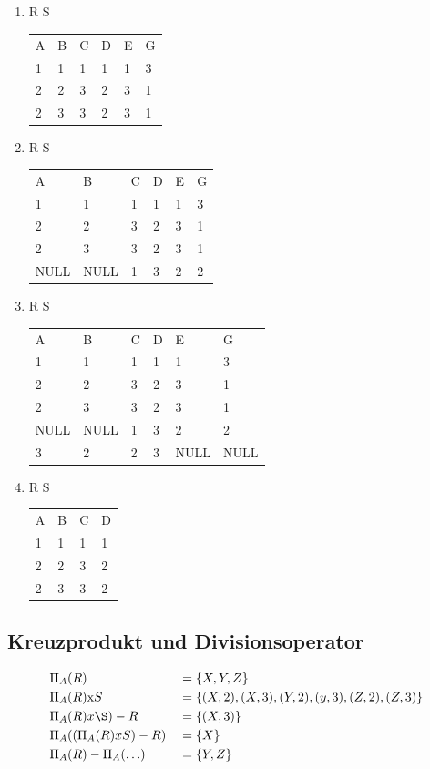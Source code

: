 \subsection{}
\begin{enumerate}
	\item R {\tiny  \textifsym{|><|}} S
	\begin{tabularx}{\textwidth}{XXXXXX}	
	A	&B	&C	&D	&E	&G \\
	1	&1	&1	&1	&1	&3 \\
	2	&2	&3	&2	&3	&1 \\
	2	&3	&3	&2	&3	&1 \\
	\end{tabularx}
	\item R {\tiny  {}} S
	\begin{tabularx}{\textwidth}{XXXXXX}	
	A	&B	&C	&D	&E	&G \\
	1	&1	&1	&1	&1	&3 \\
	2	&2	&3	&2	&3	&1 \\
	2	&3	&3	&2	&3	&1 \\
	NULL &NULL &1 &3 &2 &2 \\
	\end{tabularx}
	\item R {\tiny  {}} S
	\begin{tabularx}{\textwidth}{XXXXXX}	
	A	&B	&C	&D	&E	&G \\
	1	&1	&1	&1	&1	&3 \\
	2	&2	&3	&2	&3	&1 \\
	2	&3	&3	&2	&3	&1 \\
	NULL &NULL &1 &3 &2 &2 \\
	3	&2	&2	&3	&NULL &NULL \\
	\end{tabularx}
	\item R {\tiny  \textifsym{|><}} S
	\begin{tabularx}{\textwidth}{XXXX}	
	A	&B	&C	&D \\
	1	&1	&1	&1 \\
	2	&2	&3	&2 \\
	2	&3	&3	&2 \\
	\end{tabularx}
\end{enumerate}

\subsection{Kreuzprodukt und Divisionsoperator}
\begin{align*}
	&\Pi_A(R) &&= \{X,Y,Z\} \\
	&\Pi_A(R) \text{x} S &&= \{(X,2),(X,3),(Y,2),(y,3),(Z,2),(Z,3)\} \\
	&\Pi_A(R) x \S) - R &&= \{(X,3)\} \\
	&\Pi_A((\Pi_A (R)xS)-R) &&= \{X\} \\
	&\Pi_A(R) - \Pi_A (\ldots ) &&= \{Y,Z\}
\end{align*}

